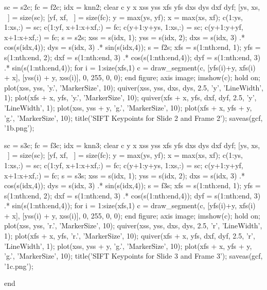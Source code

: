 sc = s2c;
fc = f2c;
idx = knn2;
clear c y x xss yss xfs yfs dxs dys dxf dyf;
[ys, xs, ~] = size(sc);
[yf, xf, ~] = size(fc);
y = max(ys, yf);
x = max(xs, xf);
c(1:ys, 1:xs,:) = sc;
c(1:yf, x+1:x+xf,:) = fc;
c(y+1:y+ys, 1:xs,:) = sc;
c(y+1:y+yf, x+1:x+xf,:) = fc;
s = s2s;
xss = s(idx, 1);
yss = s(idx, 2);
dxs = s(idx, 3) .* cos(s(idx,4));
dys = s(idx, 3) .* sin(s(idx,4));
s = f2s;
xfs = s(1:nth:end, 1);
yfs = s(1:nth:end, 2);
dxf = s(1:nth:end, 3) .* cos(s(1:nth:end,4));
dyf = s(1:nth:end, 3) .* sin(s(1:nth:end,4));
for i = 1:size(xfs,1)
    c = draw_segment(c, [yfs(i)+y, xfs(i) + x], [yss(i) + y, xss(i)], 0, 255, 0, 0);
end
figure;
axis image;
imshow(c);
hold on;
plot(xss, yss, 'y.', 'MarkerSize', 10);
quiver(xss, yss, dxs, dys, 2.5, 'y', 'LineWidth', 1);
plot(xfs + x, yfs, 'y.', 'MarkerSize', 10);
quiver(xfs + x, yfs, dxf, dyf, 2.5, 'y', 'LineWidth', 1);
plot(xss, yss + y, 'g.', 'MarkerSize', 10);
plot(xfs + x, yfs + y, 'g.', 'MarkerSize', 10);
title('SIFT Keypoints for Slide 2 and Frame 2');
saveas(gcf, '1b.png');

sc = s3c;
fc = f3c;
idx = knn3;
clear c y x xss yss xfs yfs dxs dys dxf dyf;
[ys, xs, ~] = size(sc);
[yf, xf, ~] = size(fc);
y = max(ys, yf);
x = max(xs, xf);
c(1:ys, 1:xs,:) = sc;
c(1:yf, x+1:x+xf,:) = fc;
c(y+1:y+ys, 1:xs,:) = sc;
c(y+1:y+yf, x+1:x+xf,:) = fc;
s = s3s;
xss = s(idx, 1);
yss = s(idx, 2);
dxs = s(idx, 3) .* cos(s(idx,4));
dys = s(idx, 3) .* sin(s(idx,4));
s = f3s;
xfs = s(1:nth:end, 1);
yfs = s(1:nth:end, 2);
dxf = s(1:nth:end, 3) .* cos(s(1:nth:end,4));
dyf = s(1:nth:end, 3) .* sin(s(1:nth:end,4));
for i = 1:size(xfs,1)
    c = draw_segment(c, [yfs(i)+y, xfs(i) + x], [yss(i) + y, xss(i)], 0, 255, 0, 0);
end
figure;
axis image;
imshow(c);
hold on;
plot(xss, yss, 'r.', 'MarkerSize', 10);
quiver(xss, yss, dxs, dys, 2.5, 'r', 'LineWidth', 1);
plot(xfs + x, yfs, 'r.', 'MarkerSize', 10);
quiver(xfs + x, yfs, dxf, dyf, 2.5, 'r', 'LineWidth', 1);
plot(xss, yss + y, 'g.', 'MarkerSize', 10);
plot(xfs + x, yfs + y, 'g.', 'MarkerSize', 10);
title('SIFT Keypoints for Slide 3 and Frame 3');
saveas(gcf, '1c.png');

end


